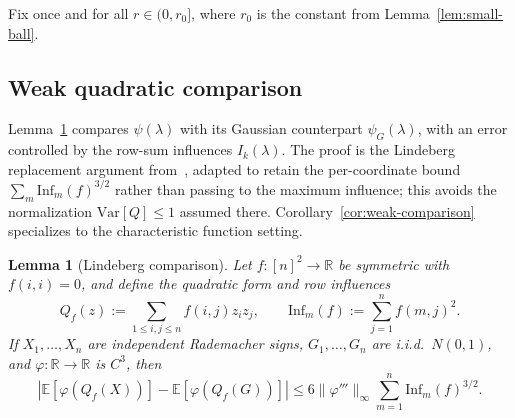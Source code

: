 \documentclass[11pt]{article}
\newtheorem{lemma}[theorem]{Lemma}
\theoremstyle{definition}
\newcommand{\R}{\mathbb{R}}
\newcommand{\E}{\mathbb{E}}
\begin{document}
Fix once and for all \(r\in(0,r_0]\), where \(r_0\) is the constant from Lemma~\ref{lem:small-ball}.

\subsection{Weak quadratic comparison}

Lemma~\ref{lem:weak-comparison} compares \(\psi(\lambda)\) with its Gaussian counterpart \(\psi_G(\lambda)\), with an error controlled by the row-sum influences \(I_k(\lambda)\). The proof is the Lindeberg replacement argument from~\cite[Theorem~3.18]{MOO2010}, adapted to retain the per-coordinate bound \(\sum_m\mathrm{Inf}_m(f)^{3/2}\) rather than passing to the maximum influence; this avoids the normalization \(\mathrm{Var}[Q]\le 1\) assumed there. Corollary~\ref{cor:weak-comparison} specializes to the characteristic function setting.

\begin{lemma}[Lindeberg comparison]\label{lem:weak-comparison}
Let \(f:[n]^2\to\R\) be symmetric with \(f(i,i)=0\), and define the quadratic form and row influences
\[
  Q_f(z):=\sum_{1\le i,j\le n}f(i,j)z_i z_j,
  \qquad
  \mathrm{Inf}_m(f):=\sum_{j=1}^n f(m,j)^2.
\]
If \(X_1,\dots,X_n\) are independent Rademacher signs, \(G_1,\dots,G_n\) are i.i.d.\ \(N(0,1)\), and \(\varphi:\R\to\R\) is \(C^3\), then
\[
  \left|\E[\varphi(Q_f(X))]-\E[\varphi(Q_f(G))]\right|
  \le 6\|\varphi'''\|_\infty \sum_{m=1}^n \mathrm{Inf}_m(f)^{3/2}.
\]
\end{lemma}
\end{document}
